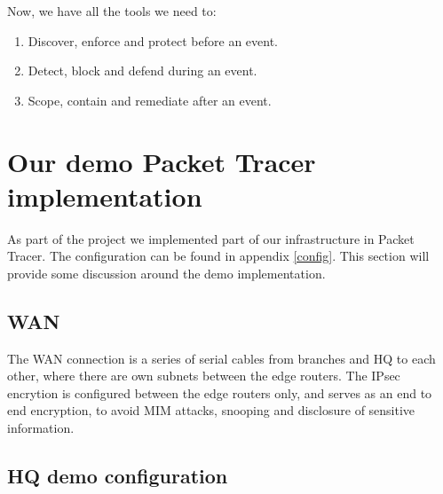Now, we have all the tools we need to:
\begin{enumerate}
    \item Discover, enforce and protect before an event.
    \item Detect, block and defend during an event.
    \item Scope, contain and remediate after an event.
\end{enumerate}



\section{Our demo Packet Tracer implementation} \label{democonfigdiscussion}


As part of the project we implemented part of our infrastructure in Packet Tracer. The configuration can be found in appendix \ref{config}. This section will provide some discussion around the demo implementation.

\subsection{WAN}

The WAN connection is a series of serial cables from branches and HQ to each other, where there are own subnets between the edge routers. 
The IPsec encrytion is configured between the edge routers only, and serves as an end to end encryption, to avoid MIM attacks, snooping and disclosure of sensitive information.

\subsection{HQ demo configuration}

